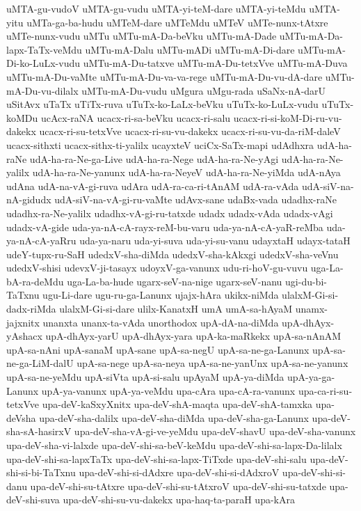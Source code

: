{uMTA-gu-vudoV
uMTA-gu-vudu
uMTA-yi-teM-dare
uMTA-yi-teMdu
uMTA-yitu
uMTa-ga-ba-hudu
uMTeM-dare
uMTeMdu
uMTeV
uMTe-nunx-tAtxre
uMTe-nunx-vudu
uMTu
uMTu-mA-Da-beVku
uMTu-mA-Dade
uMTu-mA-Da-lapx-TaTx-veMdu
uMTu-mA-Dalu
uMTu-mADi
uMTu-mA-Di-dare
uMTu-mA-Di-ko-LuLx-vudu
uMTu-mA-Du-tatxve
uMTu-mA-Du-tetxVve
uMTu-mA-Duva
uMTu-mA-Du-vaMte
uMTu-mA-Du-va-va-rege
uMTu-mA-Du-vu-dA-dare
uMTu-mA-Du-vu-dilalx
uMTu-mA-Du-vudu
uMgura
uMgu-rada
uSaNx-nA-darU
uSitAvx
uTaTx
uTiTx-ruva
uTuTx-ko-LaLx-beVku
uTuTx-ko-LuLx-vudu
uTuTx-koMDu
ucAcx-raNA
ucacx-ri-sa-beVku
ucacx-ri-salu
ucacx-ri-si-koM-Di-ru-vu-dakekx
ucacx-ri-su-tetxVve
ucacx-ri-su-vu-dakekx
ucacx-ri-su-vu-da-riM-daleV
ucacx-sithxti
ucacx-sithx-ti-yalilx
ucayxteV
uciCx-SaTx-mapi
udAdhxra
udA-ha-raNe
udA-ha-ra-Ne-ga-Live
udA-ha-ra-Nege
udA-ha-ra-Ne-yAgi
udA-ha-ra-Ne-yalilx
udA-ha-ra-Ne-yanunx
udA-ha-ra-NeyeV
udA-ha-ra-Ne-yiMda
udA-nAya
udAna
udA-na-vA-gi-ruva
udAra
udA-ra-ca-ri-tAnAM
udA-ra-vAda
udA-siV-na-nA-gidudx
udA-siV-na-vA-gi-ru-vaMte
udAvx-sane
udaBx-vada
udadhx-raNe
udadhx-ra-Ne-yalilx
udadhx-vA-gi-ru-tatxde
udadx
udadx-vAda
udadx-vAgi
udadx-vA-gide
uda-ya-nA-cA-rayx-reM-bu-varu
uda-ya-nA-cA-yaR-reMba
uda-ya-nA-cA-yaRru
uda-ya-naru
uda-yi-suva
uda-yi-su-vanu
udayxtaH
udayx-tataH
udeY-tupx-ru-SaH‌
udedxV-sha-diMda
udedxV-sha-kAkxgi
udedxV-sha-veVnu
udedxV-shisi
udevxV-ji-tasayx
udoyxV-ga-vanunx
udu-ri-hoV-gu-vuvu
uga-La-bA-ra-deMdu
uga-La-ba-hude
ugarx-seV-na-nige
ugarx-seV-nanu
ugi-du-bi-TaTxnu
ugu-Li-dare
ugu-ru-ga-Lanunx
ujajx-hAra
ukikx-niMda
ulalxM-Gi-si-dadx-riMda
ulalxM-Gi-si-dare
ulilx-KanatxH
umA
umA-sa-hAyaM
unamx-jajxnitx
unanxta
unanx-ta-vAda
unorthodox
upA-dA-na-diMda
upA-dhAyx-yAshacx
upA-dhAyx-yarU
upA-dhAyx-yara
upA-ka-maRkekx
upA-sa-nAnAM
upA-sa-nAni
upA-sanaM
upA-sane
upA-sa-negU
upA-sa-ne-ga-Lanunx
upA-sa-ne-ga-LiM-dalU
upA-sa-nege
upA-sa-neya
upA-sa-ne-yanUnx
upA-sa-ne-yanunx
upA-sa-ne-yeMdu
upA-siVta
upA-si-salu
upAyaM
upA-ya-diMda
upA-ya-ga-Lanunx
upA-ya-vanunx
upA-ya-veMdu
upa-cAra
upa-cA-ra-vanunx
upa-ca-ri-su-tetxVve
upa-deV-kaSxyXnitx
upa-deV-shA-maqta
upa-deV-shA-tamxka
upa-deVsha
upa-deV-sha-dalilx
upa-deV-sha-diMda
upa-deV-sha-ga-Lanunx
upa-deV-sha-sA-hasirxV
upa-deV-sha-vA-gi-ve-yeMdu
upa-deV-shavU
upa-deV-sha-vanunx
upa-deV-sha-vi-lalxde
upa-deV-shi-sa-beV-keMdu
upa-deV-shi-sa-lapx-Da-lilalx
upa-deV-shi-sa-lapxTaTx
upa-deV-shi-sa-lapx-TiTxde
upa-deV-shi-salu
upa-deV-shi-si-bi-TaTxnu
upa-deV-shi-si-dAdxre
upa-deV-shi-si-dAdxroV
upa-deV-shi-si-danu
upa-deV-shi-su-tAtxre
upa-deV-shi-su-tAtxroV
upa-deV-shi-su-tatxde
upa-deV-shi-suva
upa-deV-shi-su-vu-dakekx
upa-haq-ta-paraH
upa-kAra
}
